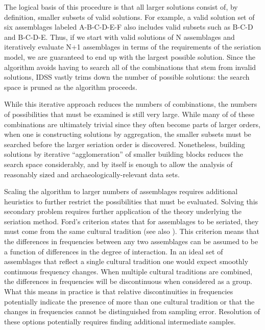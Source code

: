 \documentclass[10pt,letterpaper]{article}
\begin{document}
The logical basis of this procedure is that all larger solutions consist of, by definition, smaller subsets of valid solutions. For example, a valid solution set of six assemblages labeled A-B-C-D-E-F also includes valid subsets such as B-C-D and B-C-D-E. Thus, if we start with valid solutions of N assemblages and iteratively evaluate N+1 assemblages in terms of the requirements of the seriation model, we are guaranteed to end up with the largest possible solution. Since the algorithm avoids having to search all of the combinations that stem from invalid solutions, IDSS vastly trims down the number of possible solutions: the search space is pruned as the algorithm proceeds. 

While this iterative approach reduces the numbers of combinations, the numbers of possibilities that must be examined is still very large. While many of of these combinations are ultimately trivial since they often become parts of larger orders, when one is constructing solutions by aggregation, the smaller subsets must be searched before the larger seriation order is discovered. Nonetheless, building solutions by iterative ``agglomeration'' of smaller building blocks reduces the search space considerably, and by itself is enough to allow the analysis of reasonably sized and archaeologically-relevant data sets. 

Scaling the algorithm to larger numbers of assemblages requires additional heuristics to further restrict the possibilities that must be evaluated. Solving this secondary problem requires further application of the theory underlying the seriation method. Ford’s \cite{Ford1949} criterion states that for assemblages to be seriated, they must come from the same cultural tradition (see also \cite{Dunnell:1970aa}). This criterion means that the differences in frequencies between any two assemblages can be assumed to be a function of differences in the degree of interaction. In an ideal set of assemblages that reflect a single cultural tradition one would expect smoothly continuous frequency changes. When multiple cultural traditions are combined, the differences in frequencies will be discontinuous when considered as a group. What this means in practice is that relative discontinuities in frequencies potentially indicate the presence of more than one cultural tradition or that the changes in frequencies cannot be distinguished from sampling error. Resolution of these options potentially requires finding additional intermediate samples.
\end{document}
